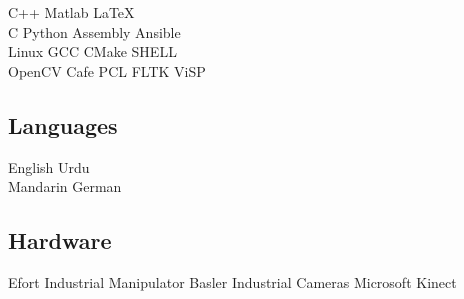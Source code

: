 \documentclass[a4paper]{deedy-resume} %
\begin{document}
\begin{minipage}[t]{0.33\textwidth}
C++ \textbullet{} Matlab \textbullet{} \LaTeX \\
C \textbullet{} Python \textbullet{} Assembly \textbullet{} Ansible \\
Linux \textbullet{} GCC \textbullet{} CMake \textbullet{} SHELL \\
OpenCV \textbullet{} Cafe \textbullet{} PCL \textbullet{} FLTK \textbullet{} ViSP \\

\vspace{\topsep} %

\subsection{Languages}
English \textbullet{} Urdu \\
Mandarin \textbullet {} German

\vspace{\topsep} %

\subsection{Hardware}
Efort Industrial Manipulator \textbullet{} Basler Industrial Cameras \textbullet{} Microsoft Kinect \\

\end{minipage}
\end{document}
